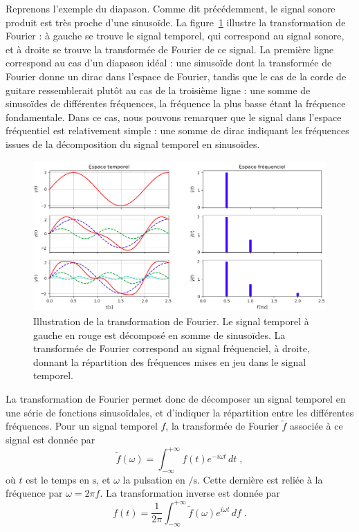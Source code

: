 Reprenons l'exemple du diapason. Comme dit précédemment, le signal sonore produit est très proche d'une sinusoïde. La figure~\ref{fig:example_tf} illustre la transformation de Fourier : à gauche se trouve le signal temporel, qui correspond au signal sonore, et à droite se trouve la transformée de Fourier de ce signal.
La première ligne correspond au cas d'un diapason idéal :
une sinusoïde dont la transformée de Fourier donne un dirac dans l'espace de Fourier, tandis que le cas de la corde de guitare ressemblerait plutôt au cas de la troisième ligne :
une somme de sinusoïdes de différentes fréquences, la fréquence la plus basse étant la fréquence fondamentale. Dans ce cas, nous pouvons remarquer que le signal dans l'espace fréquentiel est relativement simple : une somme de dirac indiquant les fréquences issues de la décomposition du signal temporel en sinusoïdes.
\begin{figure}[h]
  \centering
  \includegraphics[scale=0.45]{example_tf}
  \caption{Illustration de la transformation de Fourier. Le signal temporel à gauche en rouge est décomposé en somme de sinusoïdes. La transformée de Fourier correspond au signal fréquenciel, à droite, donnant la répartition des fréquences mises en jeu dans le signal temporel.}
  \label{fig:example_tf}
\end{figure}

La transformation de Fourier permet donc de décomposer un signal temporel en une série de fonctions sinusoïdales, et d'indiquer la répartition entre les différentes fréquences. Pour un signal temporel $f$, la transformée de Fourier $\tilde f$ associée à ce signal est donnée par
\begin{equation}
  \label{eq:def_tf}
  \tilde f(\omega) = \int_{-\infty}^{+\infty}f(t) e^{- i \omega t} \,dt  \; ,
\end{equation}
où $t$ est le temps en $\si{\second}$, et $\omega$ la pulsation en $\si{\per\second}$. Cette dernière est reliée à la fréquence par $\omega = 2 \pi f$. La transformation inverse est donnée par
\begin{equation}
  \label{eq:def_tf_inv}
   f(t) = \frac{1}{2 \pi}\int_{-\infty}^{+\infty} \tilde f(\omega) e^{ i \omega t} \,df  \; .
\end{equation}


